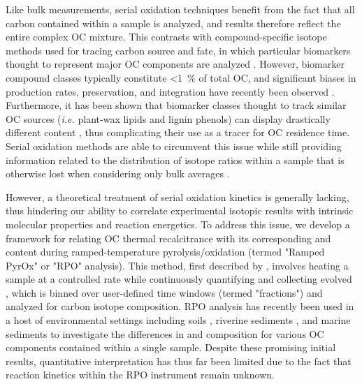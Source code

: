 Like bulk measurements, serial oxidation techniques benefit from the fact that all carbon contained within a sample is analyzed, and results therefore reflect the entire complex OC mixture. This contrasts with compound-specific isotope methods used for tracing carbon source and fate, in which particular biomarkers thought to represent major OC components are analyzed \citep[\textit{e.g.} plant-wax lipids;][]{Hayes:1989us,Eglinton:1996ff,Sessions:1999vg}. However, biomarker compound classes typically constitute \SI{<1}{\%} of total OC, and significant biases in production rates, preservation, and integration have recently been observed \citep{Garcin:2014hg,Hemingway:2016bq}. Furthermore, it has been shown that biomarker classes thought to track similar OC sources (\textit{i.e.} plant-wax lipids and lignin phenols) can display drastically different  content \citep{Feng:2013il}, thus complicating their use as a tracer for OC residence time. Serial oxidation methods are able to circumvent this issue while still providing information related to the distribution of isotope ratios within a sample that is otherwise lost when considering only bulk averages \citep{Blair:2012du}.

However, a theoretical treatment of serial oxidation kinetics is generally lacking, thus hindering our ability to correlate experimental isotopic results with intrinsic molecular properties and reaction energetics. To address this issue, we develop a framework for relating OC thermal recalcitrance with its corresponding  and  content during ramped-temperature pyrolysis/oxidation (termed "Ramped PyrOx" or "RPO" analysis). This method, first described by \citet{Rosenheim:2008ed}, involves heating a sample at a controlled rate while continuously quantifying and collecting evolved , which is binned over user-defined time windows (termed "fractions") and analyzed for carbon isotope composition. RPO analysis has recently been used in a host of environmental settings including soils \citep{Plante:2013tu}, riverine sediments \citep{Rosenheim:2012kh,Rosenheim:2013dka,Schreiner:2014jr,Bianchi:2015jr}, and marine sediments \citep{Rosenheim:2013va,Subt:2016dh} to investigate the differences in  and  composition for various OC components contained within a single sample. Despite these promising initial results, quantitative interpretation has thus far been limited due to the fact that reaction kinetics within the RPO instrument remain unknown.

